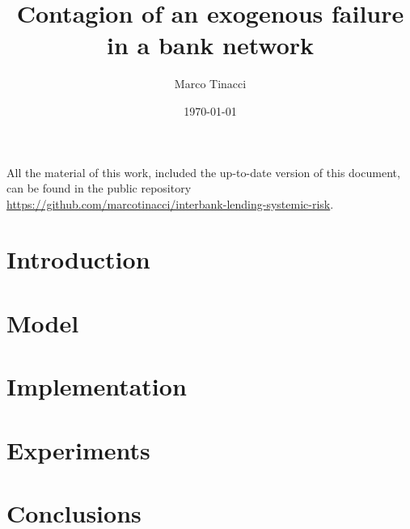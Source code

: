 \documentclass[a4paper, 11pt,draft]{article}
\begin{document}
\title{Contagion of an exogenous failure in a bank network}
\date{\today}
\author{Marco Tinacci}
\maketitle

All the material of this work, included the up-to-date version of this document, can be found in the public repository \url{https://github.com/marcotinacci/interbank-lending-systemic-risk}.

\section{Introduction} %
\label{sec:introduction}


\section{Model} %
\label{sec:model}



\section{Implementation} %
\label{sec:implementation}



\section{Experiments} %
\label{sec:experiments}



\section{Conclusions} %
\label{sec:conclusions}




\end{document}

